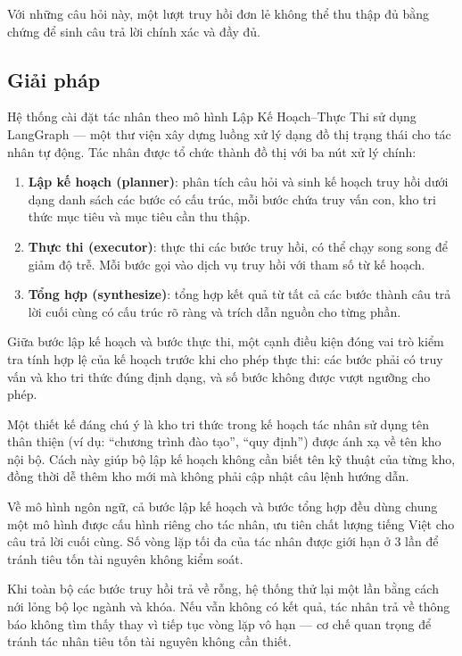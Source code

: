 \documentclass[../DoAn.tex]{subfiles}
\begin{document}
Với những câu hỏi này, một lượt truy hồi đơn lẻ không thể thu thập đủ bằng
chứng để sinh câu trả lời chính xác và đầy đủ.

\subsection{Giải pháp}

Hệ thống cài đặt tác nhân theo mô hình Lập Kế Hoạch--Thực Thi sử dụng LangGraph \cite{langgraph}
--- một thư viện xây dựng luồng xử lý dạng đồ thị trạng thái cho tác nhân tự
động. Tác nhân được tổ chức thành đồ thị với ba nút xử lý chính:

\begin{enumerate}
    \item \textbf{Lập kế hoạch (planner)}: phân tích câu hỏi và sinh kế hoạch
    truy hồi dưới dạng danh sách các bước có cấu trúc, mỗi bước chứa truy vấn
    con, kho tri thức mục tiêu và mục tiêu cần thu thập.
    \item \textbf{Thực thi (executor)}: thực thi các bước truy hồi, có thể chạy
    song song để giảm độ trễ. Mỗi bước gọi vào dịch vụ truy hồi với tham số từ
    kế hoạch.
    \item \textbf{Tổng hợp (synthesize)}: tổng hợp kết quả từ tất cả các bước
    thành câu trả lời cuối cùng có cấu trúc rõ ràng và trích dẫn nguồn cho từng
    phần.
\end{enumerate}

Giữa bước lập kế hoạch và bước thực thi, một cạnh điều kiện đóng vai trò kiểm
tra tính hợp lệ của kế hoạch trước khi cho phép thực thi: các bước phải có truy
vấn và kho tri thức đúng định dạng, và số bước không được vượt ngưỡng cho phép.

Một thiết kế đáng chú ý là kho tri thức trong kế hoạch tác nhân sử dụng tên
thân thiện (ví dụ: ``chương trình đào tạo'', ``quy định'') được ánh xạ về tên
kho nội bộ. Cách này giúp bộ lập kế hoạch không cần biết tên kỹ thuật của từng
kho, đồng thời dễ thêm kho mới mà không phải cập nhật câu lệnh hướng dẫn.

Về mô hình ngôn ngữ, cả bước lập kế hoạch và bước tổng hợp đều dùng chung một
mô hình được cấu hình riêng cho tác nhân, ưu tiên chất lượng tiếng Việt cho câu
trả lời cuối cùng. Số vòng lặp tối đa của tác nhân được giới hạn ở 3 lần để
tránh tiêu tốn tài nguyên không kiểm soát.

Khi toàn bộ các bước truy hồi trả về rỗng, hệ thống thử lại một lần bằng cách
nới lỏng bộ lọc ngành và khóa. Nếu vẫn không có kết quả, tác nhân trả về thông
báo không tìm thấy thay vì tiếp tục vòng lặp vô hạn --- cơ chế quan trọng để
tránh tác nhân tiêu tốn tài nguyên không cần thiết.
\end{document}
